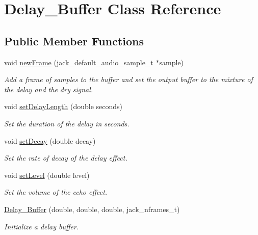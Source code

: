 \hypertarget{class_delay___buffer}{\section{Delay\+\_\+\+Buffer Class Reference}
\label{class_delay___buffer}
}
\subsection*{Public Member Functions}
\begin{DoxyCompactItemize}
\item 
void \hyperlink{group__delay_ga5d9be4601c4309b6ff4de2dc286f4da4}{new\+Frame} (jack\+\_\+default\+\_\+audio\+\_\+sample\+\_\+t $\ast$sample)
\begin{DoxyCompactList}\small\item\em Add a frame of samples to the buffer and set the output buffer to the mixture of the delay and the dry signal. \end{DoxyCompactList}\item 
void \hyperlink{group__delay_ga3e9ddb2b97fffe52c0713c26d89aae65}{set\+Delay\+Length} (double seconds)
\begin{DoxyCompactList}\small\item\em Set the duration of the delay in seconds. \end{DoxyCompactList}\item 
void \hyperlink{group__delay_ga07267d6e8a0f31681e45f755b83245a7}{set\+Decay} (double decay)
\begin{DoxyCompactList}\small\item\em Set the rate of decay of the delay effect. \end{DoxyCompactList}\item 
void \hyperlink{group__delay_ga52bd5fcb9ec627cf7da1ad3ecfc8bb87}{set\+Level} (double level)
\begin{DoxyCompactList}\small\item\em Set the volume of the echo effect. \end{DoxyCompactList}\item 
\hyperlink{group__delay_ga54225f6e4c9f3bde732baa1d824261fc}{Delay\+\_\+\+Buffer} (double, double, double, jack\+\_\+nframes\+\_\+t)
\begin{DoxyCompactList}\small\item\em Initialize a delay buffer. \end{DoxyCompactList}\end{DoxyCompactItemize}
